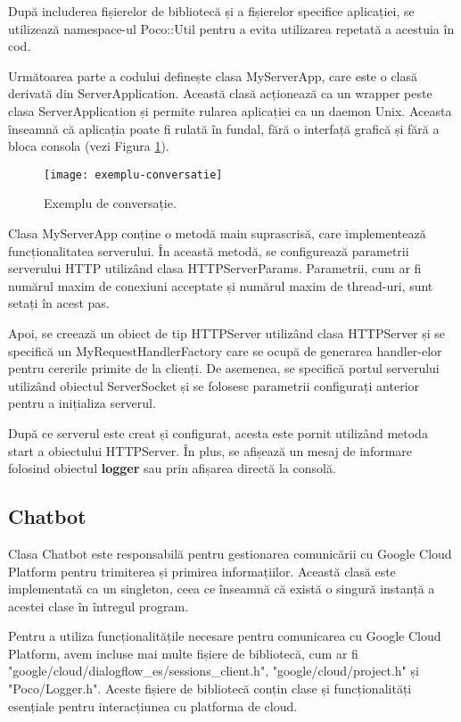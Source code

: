 După includerea fișierelor de bibliotecă și a fișierelor specifice aplicației, se utilizează namespace-ul Poco::Util pentru a evita utilizarea repetată a acestuia în cod.

Următoarea parte a codului definește clasa MyServerApp, care este o clasă derivată din ServerApplication. Această clasă acționează ca un wrapper peste clasa ServerApplication și permite rularea aplicației ca un daemon Unix. Aceasta înseamnă că aplicația poate fi rulată în fundal, fără o interfață grafică și fără a bloca consola (vezi Figura \ref{fig:exempluConversatie}).

\begin{figure}[h]
    \centering
    \texttt{[image: exemplu-conversatie]}
    \caption{Exemplu de conversație.}
    \label{fig:exempluConversatie}
\end{figure}

Clasa MyServerApp conține o metodă main suprascrisă, care implementează funcționalitatea serverului. În această metodă, se configurează parametrii serverului HTTP utilizând clasa HTTPServerParams. Parametrii, cum ar fi numărul maxim de conexiuni acceptate și numărul maxim de thread-uri, sunt setați în acest pas.

Apoi, se creează un obiect de tip HTTPServer utilizând clasa HTTPServer și se specifică un MyRequestHandlerFactory care se ocupă de generarea handler-elor pentru cererile primite de la clienți. De asemenea, se specifică portul serverului utilizând obiectul ServerSocket și se folosesc parametrii configurați anterior pentru a inițializa serverul.

După ce serverul este creat și configurat, acesta este pornit utilizând metoda start a obiectului HTTPServer. În plus, se afișează un mesaj de informare folosind obiectul \textbf{logger} sau prin afișarea directă la consolă.

\subsection{Chatbot}

Clasa Chatbot este responsabilă pentru gestionarea comunicării cu Google Cloud Platform pentru trimiterea și primirea informațiilor. Această clasă este implementată ca un singleton, ceea ce înseamnă că există o singură instanță a acestei clase în întregul program.

Pentru a utiliza funcționalitățile necesare pentru comunicarea cu Google Cloud Platform, avem incluse mai multe fișiere de bibliotecă, cum ar fi "google/cloud/dialogflow\_es/sessions\_client.h", "google/cloud/project.h" și "Poco/Logger.h". Aceste fișiere de bibliotecă conțin clase și funcționalități esențiale pentru interacțiunea cu platforma de cloud.

